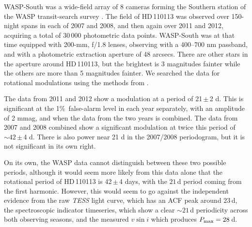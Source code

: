 \documentclass[fleqn,usenatbib]{mnras}
\newcommand{\tess}{{\it TESS}}
\newcommand{\vsini}{$v\sin{i}$}
\newcommand{\Tstar}{HD\,110113}
\begin{document}
WASP-South was a wide-field array of 8 cameras forming the Southern station of the WASP transit-search survey \citep{2006PASP..118.1407P}. The field of \Tstar{} was observed over 150-night spans in each of 2007 and 2008, and then again over 2011 and 2012, acquiring a total of 30\,000 photometric data points. 
WASP-South was at that time equipped with 200-mm, f/1.8 lenses, observing with a 400--700 nm passband, and with a photometric extraction aperture of 48 arcsecs. 
There are other stars in the aperture around \Tstar{}, but the brightest is 3 magnitudes fainter while the others are more than 5 magnitudes fainter. 
We searched the data for rotational modulations using the methods from \citet{2011PASP..123..547M}.  

The data from 2011 and 2012 show a modulation at a period of 21\,$\pm$\,2 d.
This is significant at the 1\%\ false-alarm level in each year separately, with an amplitude of 2 mmag, and when the data from the two years is combined.
The data from 2007 and 2008 combined show a significant modulation at twice this period of $\sim42$\,$\pm$\,4 d.
There is also power near 21 d in the 2007/2008 periodogram, but it is not significant in its own right.

On its own, the WASP data cannot distinguish between these two possible periods, although it would seem more likely from this data alone that the rotational period of \Tstar{} is 42\,$\pm$\,4 days, with the $21$\,d period coming from the first harmonic.
However, this would seem to go against the independent evidence from the raw \tess{} light curve, which has an ACF peak around $23$\,d, the spectroscopic indicator timeseries, which show a clear $\sim21$\,d periodicity across both observing seasons, and the measured \vsini{} which produces $P_{\rm max} = 28$\,d.
\end{document}
